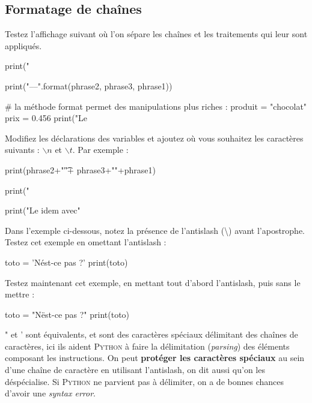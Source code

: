 \subsection{Formatage de chaînes}

Testez l'affichage suivant où l'on sépare les chaînes et les traitements qui leur sont appliqués.
\begin{python}

print("%

print("{}--{}--{}".format(phrase2, phrase3, phrase1))

# la méthode format permet des manipulations plus riches :
produit = "chocolat"
prix = 0.456
print("Le %
\end{python}


Modifiez les déclarations des variables et ajoutez o\`u vous souhaitez les caractères suivants : $\backslash n$ et $\backslash t$. Par exemple :

\begin{python}

print(phrase2+"\t"+ phrase3+"\n"+phrase1)

print("%

print("Le %
 idem avec" %
\end{python}

Dans l'exemple ci-dessous, notez la présence de l'antislash (\textbackslash) avant l'apostrophe. Testez cet exemple en omettant l'antislash :

\begin{python}
toto = 'N\'est-ce pas ?'
print(toto)
\end{python}

Testez maintenant cet exemple, en mettant tout d'abord l'antislash, puis sans le
mettre :
\begin{python}
toto = "N\"est-ce pas ?"
print(toto)
\end{python}

" et ' sont équivalents, et sont des caractères spéciaux délimitant des  chaînes
 de  caractères, ici ils aident \textsc{Python} à faire la délimitation (\textit{parsing}) des éléments composant les instructions. On peut \textbf{protéger les caractères spéciaux} au sein d'une chaîne de caractère en utilisant l'antislash, on dit aussi qu'on les déspécialise.
 Si \textsc{Python} ne parvient pas à délimiter, on a de bonnes chances d'avoir une \textit{syntax error}.


